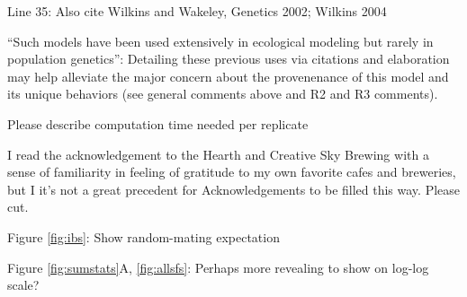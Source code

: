 

\begin{point}{Line 35:}
    Also cite Wilkins and Wakeley, Genetics 2002; Wilkins 2004
\end{point}


\begin{point}{\revref}
    ``Such models have been used extensively in ecological modeling but rarely in population genetics'': Detailing these previous uses via citations and elaboration may help alleviate the major concern about the provenenance of this model and its unique behaviors (see general comments above and R2 and R3 comments).
\end{point}


\begin{point}{\revref}
    Please describe computation time needed per replicate
\end{point}


\begin{point}{\revref}
    I read the acknowledgement to the Hearth and Creative Sky Brewing with a sense of familiarity in feeling of gratitude to my own favorite cafes and breweries, but I it's not a great precedent for Acknowledgements to be filled this way. Please cut.
\end{point}


\begin{point}{Figure \ref{fig:ibs}:}
    Show random-mating expectation
\end{point}


\begin{point}{Figure \ref{fig:sumstats}A, \ref{fig:allsfs}:}
    Perhaps more revealing to show on log-log scale?
\end{point}

